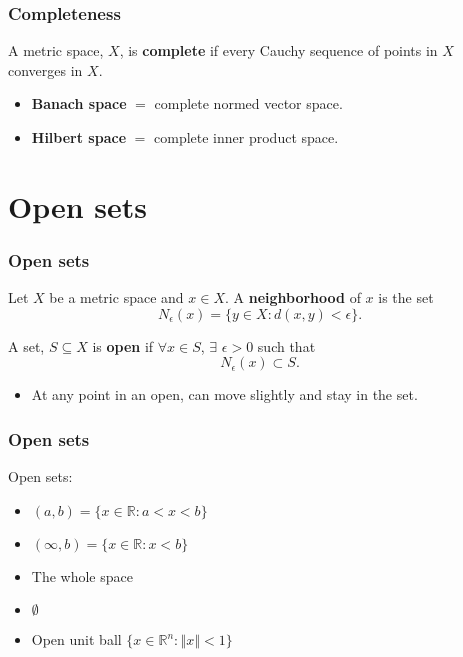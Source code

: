 \documentclass[compress]{beamer}
\def\R{\mathbb{R}}
\newcommand{\norm}[1]{\left\Vert {#1} \right\Vert}
\begin{document}
\begin{frame}
  \frametitle{Completeness}
  \begin{definition}
    A metric space, $X$, is \textbf{complete} if every Cauchy sequence of
    points in $X$ converges in $X$.
  \end{definition}
  \begin{itemize}
  \item \textbf{Banach space} $=$ complete normed vector space.
  \item \textbf{Hilbert space} $=$ complete inner product space.
  \end{itemize}
\end{frame}

\section{Open sets}

\begin{frame}
  \frametitle{Open sets}
  \begin{definition}
    Let $X$ be a metric space and $x \in X$. A \textbf{neighborhood} of
    $x$ is the set 
    \[ N_\epsilon (x) = \{y \in X: d(x,y) < \epsilon\}. \]
  \end{definition}
  \begin{definition}
    A set, $S \subseteq X$ is \textbf{open} if $\forall x \in S$,
    $\exists$ $\epsilon>0$ such that 
    \[ N_\epsilon(x) \subset S. \]
  \end{definition}
  \begin{itemize}
  \item At any point in an open, can move slightly and stay in the set.
  \end{itemize}
\end{frame}

\begin{frame}
  \frametitle{Open sets}
  \begin{example}
    Open sets:
    \begin{itemize}
    \item $(a,b) = \{x \in \R: a<x<b\}$
    \item $(\infty, b) = \{x \in \R: x < b\}$
    \item The whole space
    \item $\emptyset$
    \item Open unit ball $\{x \in \R^n: \norm{x}<1\}$     
    \end{itemize}
  \end{example}
\end{frame}
\end{document}
